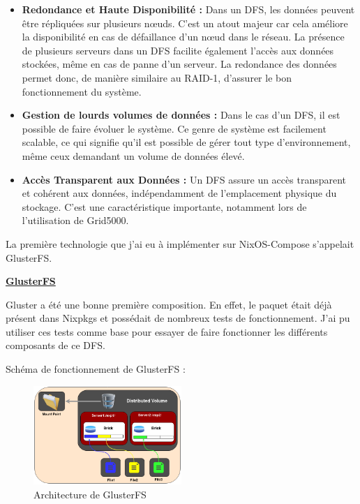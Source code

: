 \documentclass[a4paper,french,12pt, titlepage]{article}
\begin{document}
\begin{itemize}
\item
  \textbf{Redondance et Haute Disponibilité :} Dans un DFS, les données
  peuvent être répliquées sur plusieurs nœuds. C'est un atout majeur car
  cela améliore la disponibilité en cas de défaillance d'un nœud dans le
  réseau. La présence de plusieurs serveurs dans un DFS facilite
  également l'accès aux données stockées, même en cas de panne d'un
  serveur. La redondance des données permet donc, de manière similaire
  au RAID-1, d'assurer le bon fonctionnement du système.
\item
  \textbf{Gestion de lourds volumes de données :} Dans le cas d'un DFS,
  il est possible de faire évoluer le système. Ce genre de système est
  facilement scalable, ce qui signifie qu'il est possible de gérer tout
  type d'environnement, même ceux demandant un volume de données élevé.
\item
  \textbf{Accès Transparent aux Données :} Un DFS assure un accès
  transparent et cohérent aux données, indépendamment de l'emplacement
  physique du stockage. C'est une caractéristique importante, notamment
  lors de l'utilisation de Grid5000.\newline
\end{itemize}

La première technologie que j'ai eu à implémenter sur NixOS-Compose
s'appelait GlusterFS.\newline

\textbf{\href{https://www.gluster.org/}{GlusterFS}}

Gluster a été une bonne première composition. En effet, le paquet était
déjà présent dans Nixpkgs et possédait de nombreux tests de
fonctionnement. J'ai pu utiliser ces tests comme base pour essayer de
faire fonctionner les différents composants de ce DFS.\newline

Schéma de fonctionnement de GlusterFS :

\begin{figure}[h]
\centering
\includegraphics[width=0.5\textwidth,height=0.5\textheight,keepaspectratio]{images/shema-gluster.png}
\caption{Architecture de GlusterFS}
\end{figure}
\end{document}
